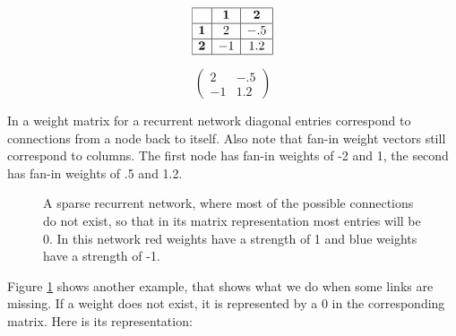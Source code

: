 \begin{minipage}{0.5\textwidth}
\centering
\[
\begin{array}{|c|c|c|}
\hline
\multicolumn{1}{|c|}{} & \textbf{1} & \textbf{2} \\
\hline
\textbf{1} & 2 & -.5 \\
\hline
\textbf{2} & -1 & 1.2 \\
\hline
\end{array}
\]
\end{minipage}
\begin{minipage}{0.5\textwidth}
\centering
\[
\begin{pmatrix}
 2  &  -.5 \\
 -1  & 1.2 
\end{pmatrix}
\]
\end{minipage}
\vspace*{.1cm} 

\noindent In a weight matrix for a recurrent network diagonal entries correspond to connections from a node back to itself. Also note that fan-in weight vectors still correspond to columns. The first node has fan-in weights of -2 and 1, the second has fan-in weights of .5 and 1.2.

\begin{figure}[h]
\centering
{}
\caption[Jeff Yoshimi.]{A sparse recurrent network, where most of the possible connections do not exist, so that in its matrix representation most entries will be 0. In this network red weights have a strength of 1 and blue weights have a strength of -1.} 
\label{sparseRecurrent}
\end{figure}

Figure \ref{sparseRecurrent} shows another example, that shows what we do when some links are missing. If a weight does not exist, it is represented by a $0$ in the corresponding matrix. Here is its representation:

